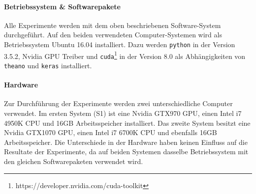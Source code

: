 \paragraph{Betriebssystem \& Softwarepakete}
\label{technical_setup:software}
Alle Experimente werden mit dem oben beschriebenen Software-System durchgeführt. Auf den beiden verwendeten Computer-Systemen wird als Betriebssystem Ubuntu 16.04 installiert. Dazu werden \texttt{python} in der Version 3.5.2, Nvidia GPU Treiber und \texttt{cuda}\footnote{https://developer.nvidia.com/cuda-toolkit} in der Version 8.0 als Abhängigkeiten von \texttt{theano} und \texttt{keras} installiert.

\paragraph{Hardware}
\label{technichal_setup:hardware}
Zur Durchführung der Experimente werden zwei unterschiedliche Computer verwendet. Im ersten System (S1) ist eine Nvidia GTX970 GPU, einen Intel i7 4950K CPU und 16GB Arbeitsspeicher installiert. Das zweite System besitzt eine Nvidia GTX1070 GPU, einen Intel i7 6700K CPU und ebenfalls 16GB Arbeitsspeicher. Die Unterschiede in der Hardware haben keinen Einfluss auf die Resultate der Experimente, da auf beiden Systemen dasselbe Betriebssystem mit den gleichen Softwarepaketen verwendet wird.
